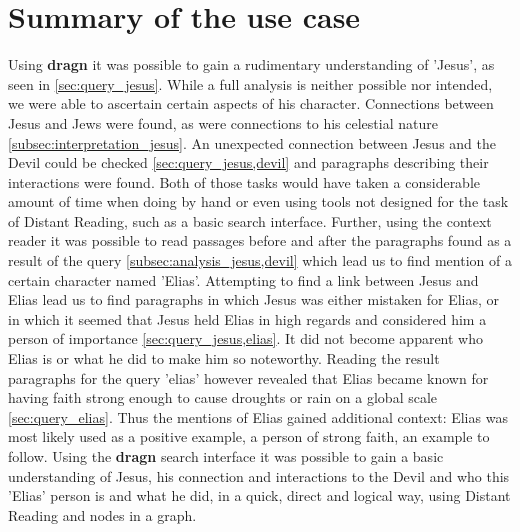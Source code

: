 \section{Summary of the use case}
Using \textbf{dragn} it was possible to gain a rudimentary understanding of 'Jesus', as seen in \ref{sec:query_jesus}. While a full analysis is neither possible nor intended, we were able to ascertain certain aspects of his character. Connections between Jesus and Jews were found, as were connections to his celestial nature \ref{subsec:interpretation_jesus}. An unexpected connection between Jesus and the Devil could be checked \ref{sec:query_jesus,devil} and paragraphs describing their interactions were found. Both of those tasks would have taken a considerable amount of time when doing by hand or even using tools not designed for the task of Distant Reading, such as a basic search interface. Further, using the context reader it was possible to read passages before and after the paragraphs found as a result of the query \ref{subsec:analysis_jesus,devil} which lead us to find mention of a certain character named 'Elias'. Attempting to find a link between Jesus and Elias lead us to find paragraphs in which Jesus was either mistaken for Elias, or in which it seemed that Jesus held Elias in high regards and considered him a person of importance \ref{sec:query_jesus,elias}. It did not become apparent who Elias is or what he did to make him so noteworthy. Reading the result paragraphs for the query 'elias' however revealed that Elias became known for having faith strong enough to cause droughts or rain on a global scale \ref{sec:query_elias}. Thus the mentions of Elias gained additional context: Elias was most likely used as a positive example, a person of strong faith, an example to follow. Using the \textbf{dragn} search interface it was possible to gain a basic understanding of Jesus, his connection and interactions to the Devil and who this 'Elias' person is and what he did, in a quick, direct and logical way, using Distant Reading and nodes in a graph.
